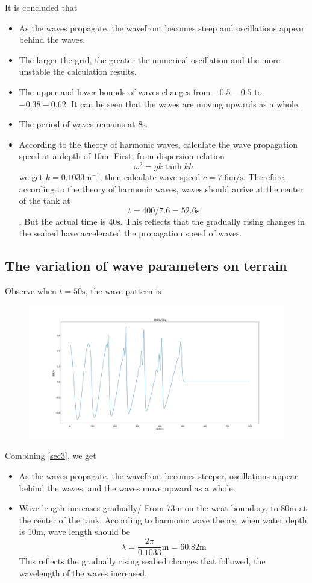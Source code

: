 \documentclass[10pt,a4paper]{article}
\begin{document}
It is concluded that
\begin{itemize}
	\item As the waves propagate, the wavefront becomes steep and oscillations appear behind the waves.
	\item The larger the grid, the greater the numerical oscillation and the more unstable the calculation results.
	\item The upper and lower bounds of waves changes from $-0.5 - 0.5$ to $-0.38 - 0.62$. It can be seen that the waves are moving upwards as a whole.
	\item The period of waves remains at $8\mbox{s}$.
	\item According to the theory of harmonic waves, calculate the wave propagation speed at a depth of $10\mbox{m}$. First, from dispersion relation
	$$\omega^2 = gk\tanh kh$$
	we get $k = 0.1033\mbox{m}^{-1}$, then calculate wave speed $c = 7.6\mbox{m/s}$. Therefore, according to the theory of harmonic waves, waves should arrive at the center of the tank at $$t = 400/7.6=52.6\mbox{s}$$. But the actual time is $40\mbox{s}$. This reflects that the gradually rising changes in the seabed have accelerated the propagation speed of waves.
\end{itemize}

\subsection{The variation of wave parameters on terrain}\label{sec4}
Observe when $t=50\mbox{s}$, the wave pattern is
\begin{figure}[htb]
	\includegraphics[width=\textwidth]{waveShape.png}
\end{figure}

Combining \ref{sec3}, we get
\begin{itemize}
	\item As the waves propagate, the wavefront becomes steeper, oscillations appear behind the waves, and the waves move upward as a whole.
	\item Wave length increases gradually/ From $73\mbox{m}$ on the weat boundary, to $80\mbox{m}$ at the center of the tank, According to harmonic wave theory, when water depth is $10\mbox{m}$, wave length should be
	$$\lambda = \frac{2\pi}{0.1033}\mbox{m} = 60.82\mbox{m}$$
	This reflects the gradually rising seabed changes that followed, the wavelength of the waves increased.
\end{itemize}
\end{document}
